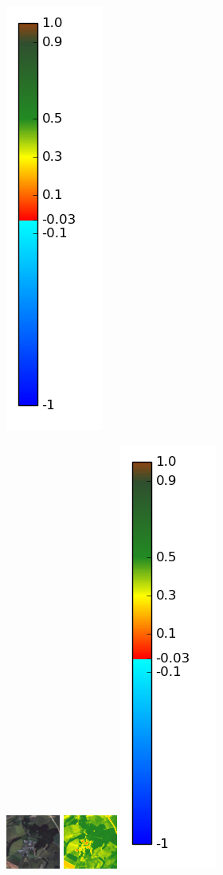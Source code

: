 \documentclass{book}
\begin{document}
\begin{figure}[H]
{\includegraphics[scale=0.3]{../3_ndvi/images/colormap.png}
}
\centerline{
\includegraphics[scale=1.5]{../3_ndvi/images/Marieux/07_rgb.png}
\includegraphics[scale=1.5]{../3_ndvi/images/Marieux/07_ndvi.png}
\includegraphics[scale=0.3]{../3_ndvi/images/colormap.png}
}
\end{figure}
\end{document}
